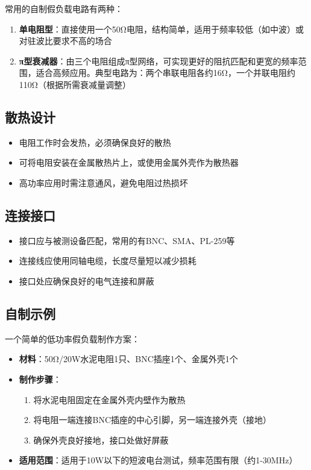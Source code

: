 常用的自制假负载电路有两种：

\begin{enumerate}
    \item \textbf{单电阻型}：直接使用一个50Ω电阻，结构简单，适用于频率较低（如中波）或对驻波比要求不高的场合
    
    \item \textbf{π型衰减器}：由三个电阻组成π型网络，可实现更好的阻抗匹配和更宽的频率范围，适合高频应用。典型电路为：两个串联电阻各约16Ω，一个并联电阻约110Ω（根据所需衰减量调整）
\end{enumerate}

\subsection{散热设计}

\begin{itemize}
    \item 电阻工作时会发热，必须确保良好的散热
    \item 可将电阻安装在金属散热片上，或使用金属外壳作为散热器
    \item 高功率应用时需注意通风，避免电阻过热损坏
\end{itemize}

\subsection{连接接口}

\begin{itemize}
    \item 接口应与被测设备匹配，常用的有BNC、SMA、PL-259等
    \item 连接线应使用同轴电缆，长度尽量短以减少损耗
    \item 接口处应确保良好的电气连接和屏蔽
\end{itemize}

\subsection{自制示例}

一个简单的低功率假负载制作方案：

\begin{itemize}
    \item \textbf{材料}：50Ω/20W水泥电阻1只、BNC插座1个、金属外壳1个
    \item \textbf{制作步骤}：
    \begin{enumerate}
        \item 将水泥电阻固定在金属外壳内壁作为散热
        \item 将电阻一端连接BNC插座的中心引脚，另一端连接外壳（接地）
        \item 确保外壳良好接地，接口处做好屏蔽
    \end{enumerate}
    \item \textbf{适用范围}：适用于10W以下的短波电台测试，频率范围有限（约1-30MHz）
\end{itemize}

